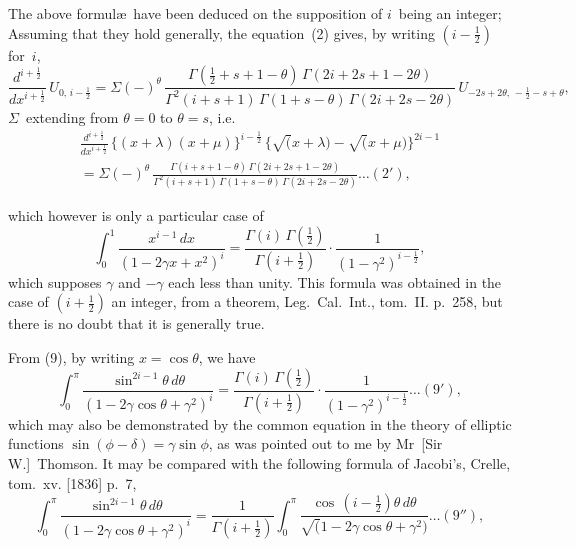 \documentclass[11pt,a4paper]{article}
\begin{document}
The above formul\ae\ have been deduced on the supposition of $i$~being an integer; Assuming that they hold generally, the equation~(2) gives, by writing $(i-\frac{1}{2})$ for~$i$,
\[
\frac{d^{i+\frac{1}{2}}}{dx^{i+\frac{1}{2}}} \, U_{0,\,i-\frac{1}{2}} = \Sigma (-)^\theta \, \frac{\Gamma(\frac{1}{2}+s+1-\theta)\,\Gamma(2i+2s+1-2\theta)}{\Gamma^2(i+s+1)\,\Gamma(1+s-\theta)\,\Gamma(2i+2s-2\theta)} \, U_{-2s+2\theta,\, -\frac{1}{2}-s+\theta},
\]
$\Sigma$~extending from $\theta=0$ to $\theta=s$, i.e.
\begin{multline*}
\frac{d^{i+\frac{1}{2}}}{dx^{i+\frac{1}{2}}} \, \{(x+\lambda)(x+\mu)\}^{i-\frac{1}{2}} \, \{\surd(x+\lambda) - \surd(x+\mu)\}^{2i-1} \\
= \Sigma (-)^\theta \, \frac{\Gamma(i+s+1-\theta)\,\Gamma(2i+2s+1-2\theta)}{\Gamma^2(i+s+1)\,\Gamma(1+s-\theta)\,\Gamma(2i+2s-2\theta)} \ldots(2'),
\end{multline*}

\newpage
which however is only a particular case of
\[
\int_0^1 \frac{x^{i-1}\,dx}{(1-2\gamma x + x^2)^i} = \frac{\Gamma(i)\,\Gamma(\frac{1}{2})}{\Gamma(i+\frac{1}{2})} \cdot \frac{1}{(1-\gamma^2)^{i-\frac{1}{2}}},
\]
which supposes $\gamma$ and $-\gamma$ each less than unity. This formula was obtained in the case of $(i+\frac{1}{2})$ an integer, from a theorem, Leg.\ Cal.\ Int., tom.~II. p.~258, but there is no doubt that it is generally true.

From (9), by writing $x = \cos\theta$, we have
\[
\int_0^\pi \frac{\sin^{2i-1}\theta\,d\theta}{(1-2\gamma\cos\theta + \gamma^2)^i} = \frac{\Gamma(i)\,\Gamma(\frac{1}{2})}{\Gamma(i+\frac{1}{2})} \cdot \frac{1}{(1-\gamma^2)^{i-\frac{1}{2}}} \ldots(9'),
\]
which may also be demonstrated by the common equation in the theory of elliptic functions $\sin(\phi-\delta) = \gamma\sin\phi$, as was pointed out to me by Mr~[Sir W.]~Thomson. It may be compared with the following formula of Jacobi's, Crelle, tom.~xv. [1836] p.~7,
\[
\int_0^\pi \frac{\sin^{2i-1}\theta\,d\theta}{(1-2\gamma\cos\theta + \gamma^2)^i} = \frac{1}{\Gamma(i+\frac{1}{2})} \int_0^\pi \frac{\cos\,(i-\frac{1}{2})\theta\,d\theta}{\surd(1-2\gamma\cos\theta + \gamma^2)} \ldots(9''),
\]
\end{document}
